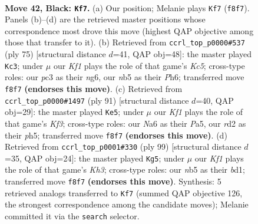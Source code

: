 \documentclass[11pt]{article}
\begin{document}
\clearpage

\begin{figure}[p]\centering
\begin{subfigure}{0.46\textwidth}\centering
\resizebox{\linewidth}{!}{%
\newchessgame
\chessboard[
  setfen={5k2/1p2p2p/n5p1/pNp5/5r1P/2P2P2/P2R4/B4K2 b - - 0 42},
  showmover=false,
  pgfstyle=straightmove, color=movearrow, markmove={f8-f7}
]}
\caption{}
\end{subfigure}\hfill
\begin{subfigure}{0.46\textwidth}\centering
\resizebox{\linewidth}{!}{%
\newchessgame
\chessboard[
  setfen={4r3/4P1p1/2p1R1Np/p2n4/2kp4/P6P/2P3P1/6K1 b - - 3 38},
  showmover=false,
  pgfstyle=straightmove, color=movearrow, markmove={c4-c3}
]}
\caption{}
\end{subfigure}
\\[4pt]
\begin{subfigure}{0.46\textwidth}\centering
\resizebox{\linewidth}{!}{%
\newchessgame
\chessboard[
  setfen={3r4/3P3R/1p3k1p/p4p1P/Pnp5/5B2/1P4K1/8 b - - 2 46},
  showmover=false,
  pgfstyle=straightmove, color=movearrow, markmove={f6-e5}
]}
\caption{}
\end{subfigure}\hfill
\begin{subfigure}{0.46\textwidth}\centering
\resizebox{\linewidth}{!}{%
\newchessgame
\chessboard[
  setfen={2r5/1RP2p2/6nk/1p2p3/1Pp1P1P1/2P5/6K1/3B4 b - - 1 50},
  showmover=false,
  pgfstyle=straightmove, color=movearrow, markmove={h6-g5}
]}
\caption{}
\end{subfigure}
\caption{\textbf{Move 42, Black: \texttt{Kf7}.} (a) Our position; Melanie plays \texttt{Kf7} (\texttt{f8f7}). Panels (b)--(d) are the retrieved master positions whose correspondence most drove this move (highest QAP objective among those that transfer to it). (b) Retrieved from \texttt{ccrl\_top\_p0000\#537} (ply 75) [structural distance $d$=41, QAP obj=48]: the master played \texttt{Kc3}; under $\mu$ our \emph{Kf1} plays the role of that game's \emph{Kc5}; cross-type roles: our \emph{p}c3 as their \emph{n}g6, our \emph{n}b5 as their \emph{P}h6; transferred move \texttt{f8f7} \textbf{(endorses this move)}. (c) Retrieved from \texttt{ccrl\_top\_p0000\#1497} (ply 91) [structural distance $d$=40, QAP obj=29]: the master played \texttt{Ke5}; under $\mu$ our \emph{Kf1} plays the role of that game's \emph{Kf3}; cross-type roles: our \emph{N}a6 as their \emph{P}a5, our \emph{r}d2 as their \emph{p}h5; transferred move \texttt{f8f7} \textbf{(endorses this move)}. (d) Retrieved from \texttt{ccrl\_top\_p0001\#330} (ply 99) [structural distance $d$=35, QAP obj=24]: the master played \texttt{Kg5}; under $\mu$ our \emph{Kf1} plays the role of that game's \emph{Kh3}; cross-type roles: our \emph{n}b5 as their \emph{b}d1; transferred move \texttt{f8f7} \textbf{(endorses this move)}. Synthesis: 5 retrieved analogs transferred to \texttt{Kf7} (summed QAP objective 126, the strongest correspondence among the candidate moves); Melanie committed it via the \texttt{search} selector.}
\label{fig:thought-m83}
\end{figure}
\end{document}
